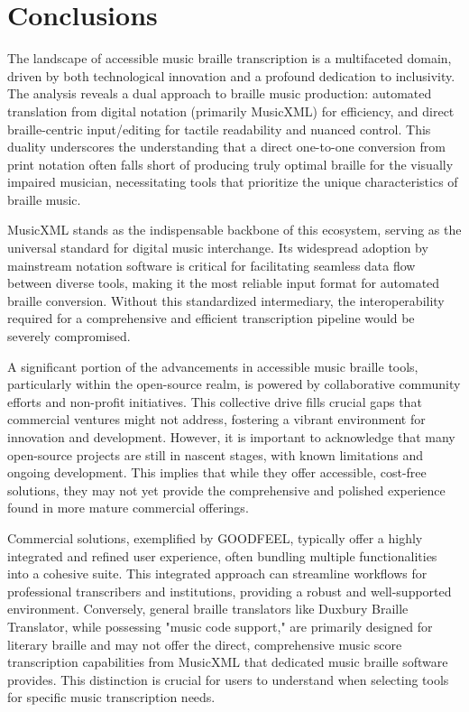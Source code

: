 \section{Conclusions}

The landscape of accessible music braille transcription is a multifaceted domain, driven by both technological innovation and a profound dedication to inclusivity. The analysis reveals a dual approach to braille music production: automated translation from digital notation (primarily MusicXML) for efficiency, and direct braille-centric input/editing for tactile readability and nuanced control. This duality underscores the understanding that a direct one-to-one conversion from print notation often falls short of producing truly optimal braille for the visually impaired musician, necessitating tools that prioritize the unique characteristics of braille music.

MusicXML stands as the indispensable backbone of this ecosystem, serving as the universal standard for digital music interchange. Its widespread adoption by mainstream notation software is critical for facilitating seamless data flow between diverse tools, making it the most reliable input format for automated braille conversion. Without this standardized intermediary, the interoperability required for a comprehensive and efficient transcription pipeline would be severely compromised.

A significant portion of the advancements in accessible music braille tools, particularly within the open-source realm, is powered by collaborative community efforts and non-profit initiatives. This collective drive fills crucial gaps that commercial ventures might not address, fostering a vibrant environment for innovation and development. However, it is important to acknowledge that many open-source projects are still in nascent stages, with known limitations and ongoing development. This implies that while they offer accessible, cost-free solutions, they may not yet provide the comprehensive and polished experience found in more mature commercial offerings.

Commercial solutions, exemplified by GOODFEEL, typically offer a highly integrated and refined user experience, often bundling multiple functionalities into a cohesive suite. This integrated approach can streamline workflows for professional transcribers and institutions, providing a robust and well-supported environment. Conversely, general braille translators like Duxbury Braille Translator, while possessing "music code support," are primarily designed for literary braille and may not offer the direct, comprehensive music score transcription capabilities from MusicXML that dedicated music braille software provides. This distinction is crucial for users to understand when selecting tools for specific music transcription needs.

